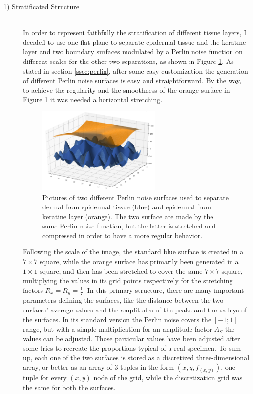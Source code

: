     \begin{description}
        \item [1) Stratificated Structure] \hfill \\
        In order to represent faithfully the stratification of different tissue layers, I decided to use one flat plane to separate epidermal tissue and the keratine layer and two boundary surfaces modulated by a Perlin noise function on different scales for the other two separations, as shown in Figure \ref{fig:2_surf_plot}. As stated in section \ref{ssec:perlin}, after some easy customization the generation of different Perlin noise surfaces is easy and straightforward. By the way, to achieve the regularity and the smoothness of the orange surface in Figure \ref{fig:2_surf_plot} it was needed a horizontal stretching.

        \begin{figure}
            \centering
            \includegraphics[width = 0.6\textwidth]{images/2_surf_plot}
            \caption{Pictures of two different Perlin noise surfaces used to separate dermal from epidermal tissue (blue) and epidermal from keratine layer (orange). The two surface are made by the same Perlin noise function, but the latter is stretched and compressed in order to have a more regular behavior.}
            \label{fig:2_surf_plot}
        \end{figure}

        Following the scale of the image, the standard blue surface is created in a $7 \times 7$ square, while the orange surface has primarily been generated in a $1 \times 1$ square, and then has been stretched to cover the same $7 \times 7$ square, multiplying the values in its grid points respectively for the stretching factors $R_x=R_y=\frac{1}{7}$. In this primary structure, there are many important parameters defining the surfaces, like the distance between the two surfaces' average values and the amplitudes of the peaks and the valleys of the surfaces. In its standard version the Perlin noise covers the $[-1;1]$ range, but with a simple multiplication for an amplitude factor $A_S$ the values can be adjusted. Those particular values have been adjusted after some tries to recreate the proportions typical of a real specimen. To sum up, each one of the two surfaces is stored as a discretized three-dimensional array, or better as an array of 3-tuples in the form $(x,y,f_{(x,y)})$, one tuple for every $(x,y)$ node of the grid, while the discretization grid was the same for both the surfaces.


\end{description}
